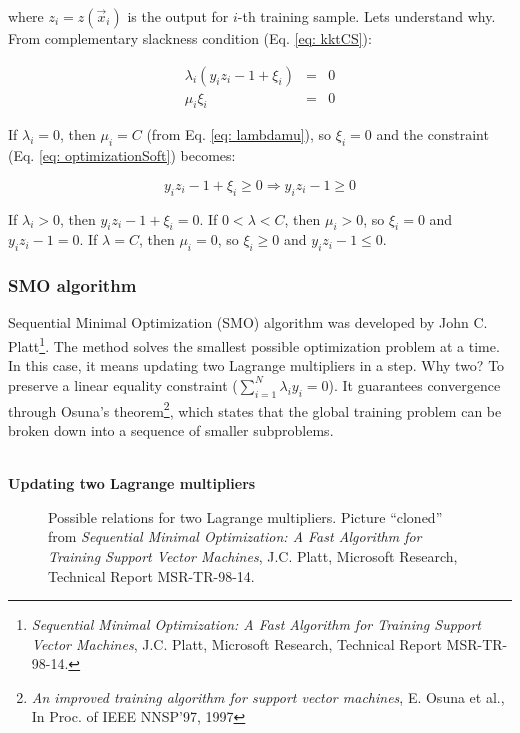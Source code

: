 where $z_i = z (\vec x_i)$ is the output for $i$-th training sample. Lets understand why. From complementary slackness condition (Eq. \ref{eq: kktCS}):

\begin{eqnarray}
 \lambda_i (y_i z_i - 1 + \xi_i) & = & 0 \\
 \mu_i \xi_i & = & 0
\end{eqnarray}

If $\lambda_i = 0$, then $\mu_i = C$ (from Eq. \ref{eq: lambdamu}), so $\xi_i = 0$ and the constraint (Eq. \ref{eq: optimizationSoft}) becomes:

\begin{equation}
 y_i z_i - 1 + \xi_i \geq 0 \Rightarrow y_i z_i - 1 \geq 0
\end{equation}

If $\lambda_i > 0$, then $y_i z_i - 1 + \xi_i = 0$. If $0 < \lambda < C$, then $\mu_i > 0$, so $\xi_i = 0$ and $y_i z_i - 1 = 0$. If $\lambda = C$, then $\mu_i = 0$, so $\xi_i \geq 0$ and $y_i z_i - 1 \leq 0$.

\subsubsection{SMO algorithm}

Sequential Minimal Optimization (SMO) algorithm was developed by John C. Platt\footnote{{\it Sequential Minimal Optimization: A Fast Algorithm for Training Support Vector Machines}, J.C. Platt, Microsoft Research, Technical Report MSR-TR-98-14.}. The method solves the smallest possible optimization problem at a time. In this case, it means updating two Lagrange multipliers in a step. Why two? To preserve a linear equality constraint ($\sum\limits_{i=1}^N\lambda_iy_i = 0$). It guarantees convergence through Osuna's theorem\footnote{{\it An improved training algorithm for support vector machines}, E. Osuna et al., In Proc. of IEEE NNSP’97, 1997}, which states that the global training problem can be broken down into a sequence of smaller subproblems.

\mbox{}\\
\noindent\textbf{Updating two Lagrange multipliers}
\mbox{}\\

\begin{figure}
\hfill
\subfigure[$y_a \neq y_b \Rightarrow \lambda_a - \lambda_b = \gamma$]{ \label{fig: smoUpdateM}}
\hfill
\subfigure[$y_a = y_b \Rightarrow \lambda_a + \lambda_b = \gamma$]{ \label{fig: smoUpdateP}}
\hfill
\caption{Possible relations for two Lagrange multipliers. Picture ``cloned'' from {\it Sequential Minimal Optimization: A Fast Algorithm for Training Support Vector Machines}, J.C. Platt, Microsoft Research, Technical Report MSR-TR-98-14.}
\label{fig: smoUpdate}
\end{figure}

